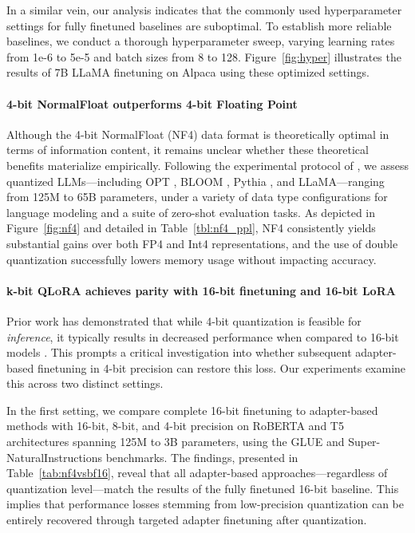 In a similar vein, our analysis indicates that the commonly used hyperparameter settings for fully finetuned baselines are suboptimal. To establish more reliable baselines, we conduct a thorough hyperparameter sweep, varying learning rates from 1e-6 to 5e-5 and batch sizes from 8 to 128. Figure~\ref{fig:hyper} illustrates the results of 7B LLaMA finetuning on Alpaca using these optimized settings.

\paragraph{4-bit NormalFloat outperforms 4-bit Floating Point}

Although the 4-bit NormalFloat (NF4) data format is theoretically optimal in terms of information content, it remains unclear whether these theoretical benefits materialize empirically. Following the experimental protocol of \citet{dettmers2022case}, we assess quantized LLMs—including OPT \citep{zhang2022opt}, BLOOM \cite{scao2022bloom}, Pythia \cite{biderman2023pythia}, and LLaMA—ranging from 125M to 65B parameters, under a variety of data type configurations for language modeling and a suite of zero-shot evaluation tasks. As depicted in Figure~\ref{fig:nf4} and detailed in Table~\ref{tbl:nf4_ppl}, NF4 consistently yields substantial gains over both FP4 and Int4 representations, and the use of double quantization successfully lowers memory usage without impacting accuracy.

\paragraph{k-bit \textsc{QLoRA} achieves parity with 16-bit finetuning and 16-bit LoRA}

Prior work has demonstrated that while 4-bit quantization is feasible for \emph{inference}, it typically results in decreased performance when compared to 16-bit models \citep{dettmers2022case,frantar2022gptq}. This prompts a critical investigation into whether subsequent adapter-based finetuning in 4-bit precision can restore this loss. Our experiments examine this across two distinct settings.

In the first setting, we compare complete 16-bit finetuning to adapter-based methods with 16-bit, 8-bit, and 4-bit precision on RoBERTA and T5 architectures spanning 125M to 3B parameters, using the GLUE and Super-NaturalInstructions benchmarks. The findings, presented in Table~\ref{tab:nf4vsbf16}, reveal that all adapter-based approaches—regardless of quantization level—match the results of the fully finetuned 16-bit baseline. This implies that performance losses stemming from low-precision quantization can be entirely recovered through targeted adapter finetuning after quantization.


